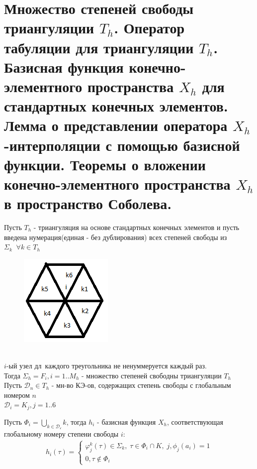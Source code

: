 \documentclass[__main__.tex]{subfiles}
\begin{document}
\section{Множество степеней свободы триангуляции $T_h$. Оператор табуляции для триангуляции $T_h$. Базисная функция конечно-элементного пространства $X_h$ для стандартных конечных элементов. Лемма о представлении оператора $X_h$ -интерполяции с помощью базисной функции. Теоремы о вложении конечно-элементного пространства $X_h$ в пространство Соболева.}

\begin{definition}
	Пусть $T_h$ - триангуляция на основе стандартных конечных элементов  и пусть введена нумерация(единая - без дублирования) всех степеней свободы из $\Sigma_k \;\; \forall k \in T_h$
\begin{figure}
\includegraphics[width=0.4\linewidth]{14.1.png}
\end{figure}\\
$i$-ый узел дл\ каждого треугольника не ненуммеруется каждый раз. \\
Тогда $\Sigma_h = {F_i, i=1..M_h}$ - множество степеней свободны триангуляции $T_h$\\
Пусть $\mathcal{D}_n \in T_h$ - мн-во КЭ-ов, содержащих степень свободы с глобальным номером $n$\\
$\mathcal{D}_i = {K_j, j=1..6}$
\end{definition}

\begin{definition}
	Пусть $\Phi_i = \bigcup_{k \in \mathcal{D_i}}k$, тогда $h_i$ - базисная функция $X_h$, соответствующая глобальному номеру степени свободы $i$:
	\begin{gather*}
		h_i(\tau) =
		\begin{cases}
		\varphi_j^k(\tau)\in \Sigma_k, \; \tau \in \Phi_i \cap K, \; j, \phi_j(a_i)=1\\
		0, \tau \notin \Phi_i
		\end{cases}
	\end{gather*}
\end{definition}
\end{document}
